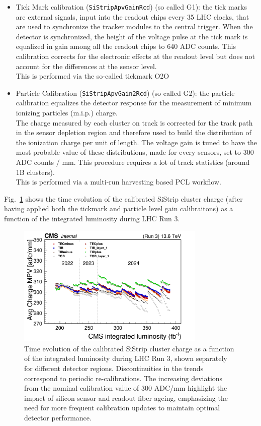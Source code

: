 \begin{itemize}
\item Tick Mark calibration (\texttt{SiStripApvGainRcd}) (so called G1): the tick marks are external signals, input into the readout chips every 35 LHC clocks, that are used to synchronize the tracker modules to the central trigger.
When the detector is synchronized, the height of the voltage pulse at the tick mark is equalized in gain among all the readout chips to 640 ADC counts. This calibration corrects for the electronic effects at the readout level but does not account for the differences at the sensor level.\\
This is performed via the so-called tickmark O2O 
\item Particle Calibration (\texttt{SiStripApvGain2Rcd}) (so called G2): the particle calibration equalizes the detector response for the measurement of minimum ionizing particles (m.i.p.) charge. \\
The charge measured by each cluster on track is corrected for the track path in the sensor depletion region and therefore used to build the distribution of the ionization charge per unit of length. The voltage gain is tuned to have the most probable value of these distributions, made for every sensors, set to 300 ADC counts / mm. This procedure requires a lot of track statistics (around 1B clusters).\\
This is performed via a multi-run harvesting based PCL workflow.
\end{itemize}

Fig.~\ref{fig:StripClusterCharge} shows the time evolution of the calibrated SiStrip cluster charge (after having applied both the tickmark and particle level gain calibraitons) as a function of the integrated luminosity during LHC Run 3. 
 
\begin{figure}[htbp]
   \centering
	\includegraphics[width=0.8\textwidth]{figures/CalibratedCharge_run3_lumi.png}
   \caption{Time evolution of the calibrated SiStrip cluster charge as a function of the integrated luminosity during LHC Run 3, shown separately for different detector regions. Discontinuities in the trends correspond to periodic re-calibrations. The increasing deviations from the nominal calibration value of 300 ADC/mm highlight the impact of silicon sensor and readout fiber ageing, emphasizing the need for more frequent calibration updates to maintain optimal detector performance.}
   \label{fig:StripClusterCharge}
\end{figure}

